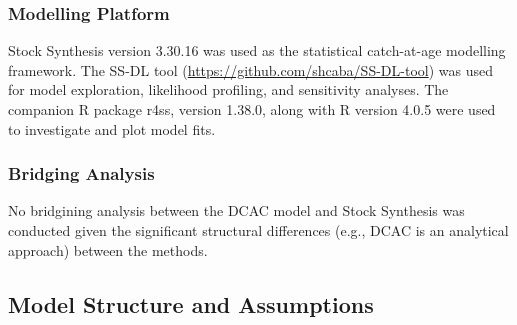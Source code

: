 \documentclass[11pt,
  english,
  a4paper,
]{article}
\begin{document}
\leavevmode\tagmcend\tagstructend\par


\hypertarget{modelling-platform}{%
\subsubsection{Modelling Platform}\label{modelling-platform}}

\leavevmode\tagmcend\tagstructend


Stock Synthesis version 3.30.16 was used as the statistical catch-at-age modelling framework. The SS-DL tool ({\url{https://github.com/shcaba/SS-DL-tool}\leavevmode\tagmcend\tagstructend}) was used for model exploration, likelihood profiling, and sensitivity analyses. The companion R package r4ss, version 1.38.0, along with R version 4.0.5 were used to investigate and plot model fits.

\leavevmode\tagmcend\tagstructend\par


\hypertarget{bridging-analysis}{%
\subsubsection{Bridging Analysis}\label{bridging-analysis}}

\leavevmode\tagmcend\tagstructend


No bridgining analysis between the DCAC model and Stock Synthesis was conducted given the significant structural differences (e.g., DCAC is an analytical approach) between the methods.

\leavevmode\tagmcend\tagstructend\par


\hypertarget{model-structure-and-assumptions}{%
\subsection{Model Structure and Assumptions}\label{model-structure-and-assumptions}}

\leavevmode\tagmcend\tagstructend
\end{document}
